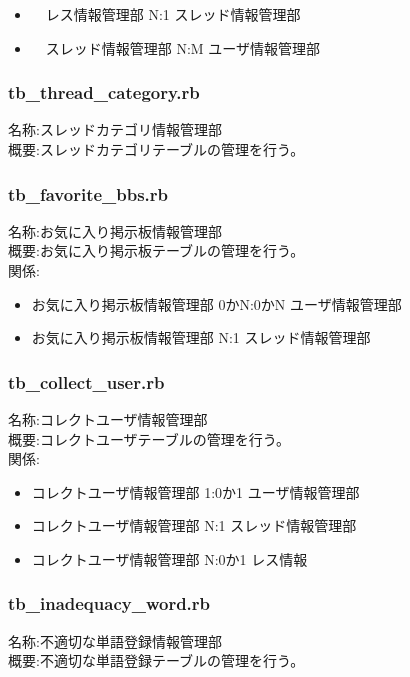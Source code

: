 \documentclass[a4j]{jarticle}
\begin{document}
  \begin{itemize}
  \item　レス情報管理部 N:1 スレッド情報管理部
  \item　スレッド情報管理部 N:M ユーザ情報管理部 
  \end{itemize}

\subsubsection{tb\_thread\_category.rb}
  \noindent 
  名称:スレッドカテゴリ情報管理部\\
  概要:スレッドカテゴリテーブルの管理を行う。\\
  
\subsubsection{tb\_favorite\_bbs.rb}
  \noindent 
  名称:お気に入り掲示板情報管理部\\
  概要:お気に入り掲示板テーブルの管理を行う。\\
  関係:  
  \begin{itemize}
  \item お気に入り掲示板情報管理部 0かN:0かN ユーザ情報管理部
  \item お気に入り掲示板情報管理部 N:1 スレッド情報管理部 
  \end{itemize}

\subsubsection{tb\_collect\_user.rb}
  \noindent 
  名称:コレクトユーザ情報管理部\\
  概要:コレクトユーザテーブルの管理を行う。\\
  関係:  
  \begin{itemize}
  \item コレクトユーザ情報管理部 1:0か1 ユーザ情報管理部
  \item コレクトユーザ情報管理部 N:1 スレッド情報管理部
  \item コレクトユーザ情報管理部 N:0か1 レス情報  
  \end{itemize}
  
\subsubsection{tb\_inadequacy\_word.rb}
  \noindent 
  名称:不適切な単語登録情報管理部\\
  概要:不適切な単語登録テーブルの管理を行う。\\
\end{document}
